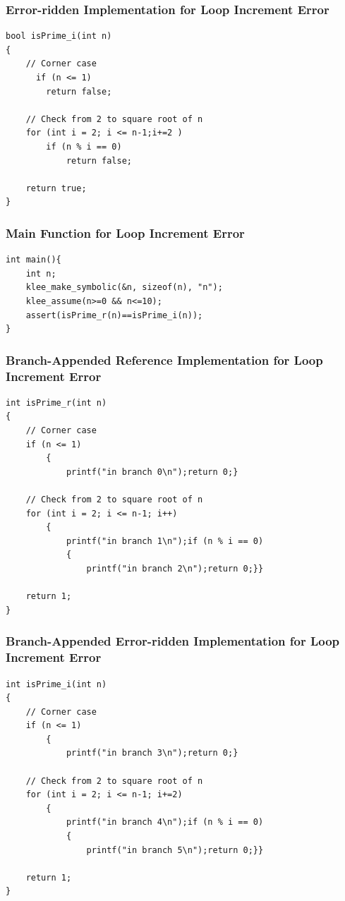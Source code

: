 \subsubsection{Error-ridden Implementation for Loop Increment Error}
\begin{verbatim}
bool isPrime_i(int n)
{
    // Corner case
      if (n <= 1)
        return false;
 
    // Check from 2 to square root of n
    for (int i = 2; i <= n-1;i+=2 )
        if (n % i == 0)
            return false;
 
    return true;
}
\end{verbatim}
\subsubsection{Main Function for Loop Increment Error}
\begin{verbatim}
int main(){
    int n;
    klee_make_symbolic(&n, sizeof(n), "n");
    klee_assume(n>=0 && n<=10);
    assert(isPrime_r(n)==isPrime_i(n));
}
\end{verbatim}
\subsubsection{Branch-Appended Reference Implementation for Loop Increment Error}
\begin{verbatim}
int isPrime_r(int n)
{
    // Corner case
    if (n <= 1)
        {
            printf("in branch 0\n");return 0;}

    // Check from 2 to square root of n
    for (int i = 2; i <= n-1; i++)
        {
            printf("in branch 1\n");if (n % i == 0)
            {
                printf("in branch 2\n");return 0;}}

    return 1;
}
\end{verbatim}

\subsubsection{Branch-Appended Error-ridden Implementation for Loop Increment Error}

\begin{verbatim}
int isPrime_i(int n)
{
    // Corner case
    if (n <= 1)
        {
            printf("in branch 3\n");return 0;}

    // Check from 2 to square root of n
    for (int i = 2; i <= n-1; i+=2)
        {
            printf("in branch 4\n");if (n % i == 0)
            {
                printf("in branch 5\n");return 0;}}

    return 1;
}
\end{verbatim}
